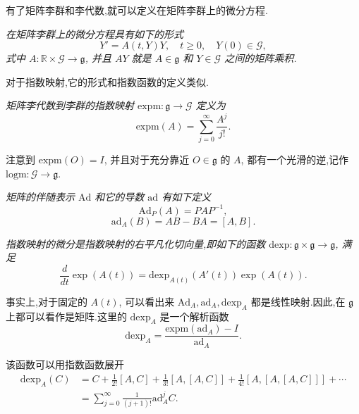 有了矩阵李群和李代数,就可以定义在矩阵李群上的微分方程.
\begin{definition}
	\emph{在矩阵李群上的微分方程具有如下的形式
	\begin{equation*}
		Y'=A(t,Y)Y,\quad t\geq 0,\quad Y(0)\in \mathcal{G},
	\end{equation*}
	式中 $A:\mathbb{R}\times \mathcal{G}\to \mathfrak{g}$, 并且 $AY$ 就是 $A\in \mathfrak{g}$ 和 $Y\in \mathcal{G}$ 之间的矩阵乘积.}
\end{definition}

对于指数映射,它的形式和指数函数的定义类似.
\begin{definition}
	\emph{矩阵李代数到李群的指数映射 $\mbox{expm}:\mathfrak{g}\to\mathcal{G}$ 定义为
	\begin{equation*}
		\mbox{expm}(A)=\sum_{j=0}^{\infty}\frac{A^j}{j!}.
	\end{equation*}}
\end{definition}

注意到 $\mbox{expm}(O)=I$, 并且对于充分靠近 $O\in \mathfrak{g}$ 的 $A$, 都有一个光滑的逆,记作 $\mbox{logm}:\mathcal{G}\to\mathfrak{g}$.

\begin{definition}
	\emph{矩阵的伴随表示 $\mbox{Ad}$ 和它的导数 $\mbox{ad}$ 有如下定义
	\begin{equation*}
		\mbox{Ad}_P(A)=PAP^{-1},
	\end{equation*}
	\begin{equation*}
		\mbox{ad}_A(B)=AB-BA=[A,B].
	\end{equation*}}
\end{definition}

\begin{definition}
	\emph{指数映射的微分是指数映射的右平凡化切向量,即如下的函数 $\mbox{dexp}:\mathfrak{g}\times \mathfrak{g}\to \mathfrak{g}$, 满足
	\begin{equation*}
		\frac{d}{dt}\exp(A(t))=\mbox{dexp}_{A(t)}(A'(t))\exp(A(t)).
	\end{equation*}}
\end{definition}

事实上,对于固定的 $A(t)$, 可以看出来 $\mbox{Ad}_A,\mbox{ad}_A,\mbox{dexp}_A$ 都是线性映射.因此,在 $\mathfrak{g}$ 上都可以看作是矩阵.这里的 $\mbox{dexp}_A$ 是一个解析函数
\begin{equation*}
	\mbox{dexp}_A=\frac{\mbox{expm}(\mbox{ad}_A)-I}{\mbox{ad}_A}.
\end{equation*}

该函数可以用指数函数展开
\begin{equation*}
	\begin{aligned}
		\mbox{dexp}_A(C)&=C+\frac{1}{2!}[A,C]+\frac{1}{3!}[A,[A,C]]+\frac{1}{4!}[A,[A,[A,C]]]+\cdots\\
		&=\sum_{j=0}^{\infty}\frac{1}{(j+1)!}\mbox{ad}^j_AC.
	\end{aligned}
\end{equation*}

